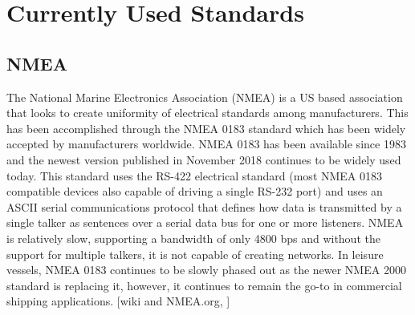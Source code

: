 \documentclass{report}
\begin{document}
\section {}

\chapter{Currently Used Standards}
\section{NMEA}
The National Marine Electronics Association (NMEA) is a US based association that looks to create uniformity of electrical standards among manufacturers. This has been accomplished through the NMEA 0183 standard which has been widely accepted by manufacturers worldwide. NMEA 0183 has been available since 1983 and the newest version published in November 2018 continues to be widely used today. This standard uses the RS-422 electrical standard (most NMEA 0183 compatible devices also capable of driving a single RS-232 port) and uses an ASCII serial communications protocol that defines how data is transmitted by a single talker as sentences over a serial data bus for one or more listeners. NMEA is relatively slow, supporting a bandwidth of only 4800 bps and without the support for multiple talkers, it is not capable of creating networks. In leisure vessels, NMEA 0183 continues to be slowly phased out as the newer NMEA 2000 standard is replacing it, however, it continues to remain the go-to in commercial shipping applications.
[wiki and NMEA.org, ] 
\end{document}
